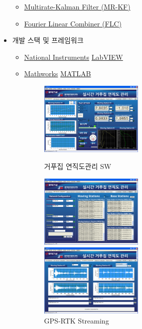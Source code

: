 \begin{itemize}
\begin{itemize}
		      \item \href{http://scholar.lib.vt.edu/theses/available/etd-062899-064821/unrestricted/etd.PDF}{Multirate-Kalman  Filter (MR-KF)}
		      \item \href{http://ieeexplore.ieee.org/xpl/login.jsp?tp=\&arnumber=258116\&url=http\%3A\%2F\%2Fieeexplore.ieee.org\%2Fxpls\%2Fabs_all.jsp\%3Farnumber\%3D258116}{Fourier Linear Combiner (FLC)}
	      \end{itemize}
	\item 개발 스택 및 프레임워크
	      \begin{itemize}
		      \item \href{https://en.wikipedia.org/wiki/National_Instruments}{National Instruments} \href{https://en.wikipedia.org/wiki/LabVIEW}{LabVIEW}
		      \item \href{https://en.wikipedia.org/wiki/MathWorks}{Mathworks} \href{https://en.wikipedia.org/wiki/MATLAB}{MATLAB}
		            \begin{figure}[ht]
			            \begin{fullwidth}
				            \centering
				            \parbox{0.5\textwidth}{
					            \includegraphics[width=0.5\textwidth] {images/gps_01.png}
					            \caption*{거푸집 연직도관리 SW}
				            }\qquad
				            \parbox{0.5\textwidth}{
					            \includegraphics[width=0.5\textwidth] {images/gps_02.png}
					            \caption*{GPS-RTK Streaming}
				            }\qquad
				            \parbox{0.5\textwidth}{
					            \includegraphics[width=0.5\textwidth] {images/gps_03.png}
}
\end{fullwidth}
\end{figure}
\end{itemize}
\end{itemize}
